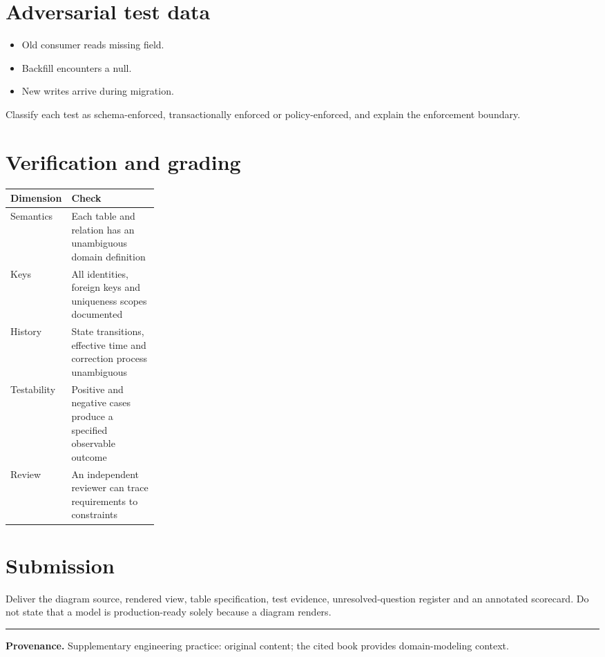 \documentclass[11pt,letterpaper]{article}
\begin{document}
\section{Adversarial test data}
\begin{itemize}
\item Old consumer reads missing field.
\item Backfill encounters a null.
\item New writes arrive during migration.
\end{itemize}
Classify each test as schema-enforced, transactionally enforced or policy-enforced, and explain the enforcement boundary.


\section{Verification and grading}
\begin{tabularx}{\linewidth}{@{}>{\raggedright\arraybackslash}p{0.25\linewidth}>{\raggedright\arraybackslash}X@{}}
\toprule
\textbf{Dimension} & \textbf{Check} \\ 
\midrule
Semantics & Each table and relation has an unambiguous domain definition \\ 
Keys & All identities, foreign keys and uniqueness scopes documented \\ 
History & State transitions, effective time and correction process unambiguous \\ 
Testability & Positive and negative cases produce a specified observable outcome \\ 
Review & An independent reviewer can trace requirements to constraints \\ 
\bottomrule
\end{tabularx}

\section{Submission}
Deliver the diagram source, rendered view, table specification, test evidence, unresolved-question register and an annotated scorecard. Do not state that a model is production-ready solely because a diagram renders.


\vfill
\hrule
{\footnotesize\textbf{Provenance.} Supplementary engineering practice: original content; the cited book provides domain-modeling context.}
\end{document}
